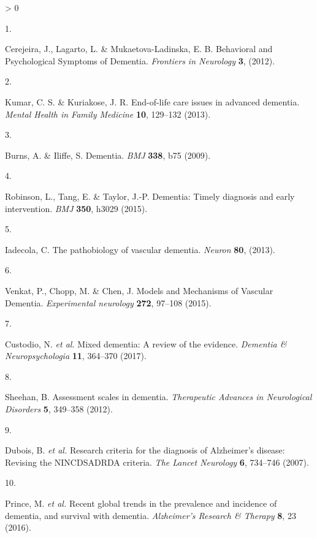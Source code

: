 \documentclass[a4paper, twoside]{templates/ociamthesis}
\newlength{\cslhangindent}
\newlength{\csllabelwidth}
\newenvironment{CSLReferences}[3] %
 {%
  \setlength{\parindent}{0pt}
  \ifodd #1 \everypar{\setlength{\hangindent}{\cslhangindent}}\ignorespaces\fi
  \ifnum #2 > 0
  \setlength{\parskip}{#2\baselineskip}
  \fi
 }%
 {}
\newcommand{\CSLLeftMargin}[1]{\parbox[t]{\maxof{\widthof{#1}}{\csllabelwidth}}{#1}}
\newcommand{\CSLRightInline}[1]{\parbox[t]{\linewidth - \csllabelwidth}{#1}}
\begin{document}
\hypertarget{refs}{}
\begin{CSLReferences}{0}{0}
\leavevmode\hypertarget{ref-cerejeira2012}{}%
\CSLLeftMargin{1. }
\CSLRightInline{Cerejeira, J., Lagarto, L. \& Mukaetova-Ladinska, E. B. Behavioral and {Psychological Symptoms} of {Dementia}. \emph{Frontiers in Neurology} \textbf{3}, (2012).}

\leavevmode\hypertarget{ref-kumar2013}{}%
\CSLLeftMargin{2. }
\CSLRightInline{Kumar, C. S. \& Kuriakose, J. R. End-of-life care issues in advanced dementia. \emph{Mental Health in Family Medicine} \textbf{10}, 129--132 (2013).}

\leavevmode\hypertarget{ref-burns2009}{}%
\CSLLeftMargin{3. }
\CSLRightInline{Burns, A. \& Iliffe, S. Dementia. \emph{BMJ} \textbf{338}, b75 (2009).}

\leavevmode\hypertarget{ref-robinson2015}{}%
\CSLLeftMargin{4. }
\CSLRightInline{Robinson, L., Tang, E. \& Taylor, J.-P. Dementia: Timely diagnosis and early intervention. \emph{BMJ} \textbf{350}, h3029 (2015).}

\leavevmode\hypertarget{ref-iadecola2013}{}%
\CSLLeftMargin{5. }
\CSLRightInline{Iadecola, C. The pathobiology of vascular dementia. \emph{Neuron} \textbf{80}, (2013).}

\leavevmode\hypertarget{ref-venkat2015}{}%
\CSLLeftMargin{6. }
\CSLRightInline{Venkat, P., Chopp, M. \& Chen, J. Models and {Mechanisms} of {Vascular Dementia}. \emph{Experimental neurology} \textbf{272}, 97--108 (2015).}

\leavevmode\hypertarget{ref-custodio2017}{}%
\CSLLeftMargin{7. }
\CSLRightInline{Custodio, N. \emph{et al.} Mixed dementia: A review of the evidence. \emph{Dementia \& Neuropsychologia} \textbf{11}, 364--370 (2017).}

\leavevmode\hypertarget{ref-sheehan2012}{}%
\CSLLeftMargin{8. }
\CSLRightInline{Sheehan, B. Assessment scales in dementia. \emph{Therapeutic Advances in Neurological Disorders} \textbf{5}, 349--358 (2012).}

\leavevmode\hypertarget{ref-dubois2007}{}%
\CSLLeftMargin{9. }
\CSLRightInline{Dubois, B. \emph{et al.} Research criteria for the diagnosis of {Alzheimer}'s disease: Revising the {NINCDS}{{ADRDA}} criteria. \emph{The Lancet Neurology} \textbf{6}, 734--746 (2007).}

\leavevmode\hypertarget{ref-prince2016}{}%
\CSLLeftMargin{10. }
\CSLRightInline{Prince, M. \emph{et al.} Recent global trends in the prevalence and incidence of dementia, and survival with dementia. \emph{Alzheimer's Research \& Therapy} \textbf{8}, 23 (2016).}


\end{CSLReferences}
\end{document}
